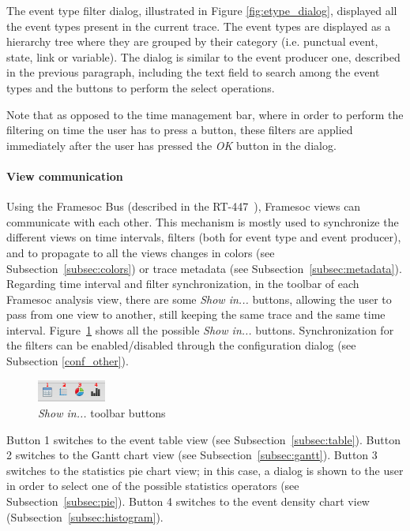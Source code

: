 \documentclass[twoside]{article}
\begin{document}
\begin{sloppypar}
The event type filter dialog, illustrated in Figure \ref{fig:etype_dialog}, displayed all the event types present in the current trace. The event types are displayed as a hierarchy tree where they are grouped by their category (i.e. punctual event, state, link or variable). The dialog is similar to the event producer one, described in the previous paragraph, including the text field to search among the event types and the buttons to perform the select operations.

Note that as opposed to the time management bar, where in order to perform the filtering on time the user has to press a button, these filters are applied immediately after the user has pressed the \emph{OK} button in the dialog.

\paragraph{View communication} Using the Framesoc Bus (described in the RT-447~\cite{pagano:hal-00977887}), Framesoc views can communicate with each other. This mechanism is mostly used to synchronize the different views on time intervals, filters (both for event type and event producer), and to propagate to all the views changes in colors (see Subsection~\ref{subsec:colors}) or trace metadata (see Subsection~\ref{subsec:metadata}).
Regarding time interval and filter synchronization, in the toolbar of each Framesoc analysis view, there are some \emph{Show in...} buttons, allowing the user to pass from one view to another, still keeping the same trace and the same time interval. Figure~\ref{fig:show_in} shows all the possible \emph{Show in...} buttons. 
Synchronization for the filters can be enabled/disabled through the configuration dialog (see Subsection \ref{conf_other}).

\begin{figure}[h!]
  \centering
    \includegraphics[width=0.2\textwidth]{images/show_in_icons.png}
  \caption{\emph{Show in...} toolbar buttons}
  \label{fig:show_in}
\end{figure}

Button \num{1} switches to the event table view (see Subsection~\ref{subsec:table}). Button \num{2} switches to the Gantt chart view (see Subsection~\ref{subsec:gantt}). Button \num{3} switches to the statistics pie chart view; in this case, a dialog is shown to the user in order to select one of the possible statistics operators (see Subsection~\ref{subsec:pie}). Button \num{4} switches to the event density chart view (Subsection~\ref{subsec:histogram}).


\end{sloppypar}
\end{document}
